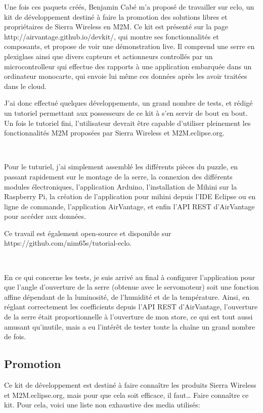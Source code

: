 \documentclass{article}
\begin{document}
Une fois ces paquets créés, Benjamin Cabé m’a proposé de travailler sur eclo, un kit de développement destiné à faire la promotion des solutions libres et propriétaires de Sierra Wireless en M2M. Ce kit est présenté sur la page http://airvantage.github.io/devkit/, qui montre ses fonctionnalités et composants, et propose de voir une démonstration live.
Il comprend une serre en plexiglass ainsi que divers capteurs et actionneurs controllés par un microcontrolleur qui effectue des rapports à une application embarquée dans un ordinateur monocarte, qui envoie lui même ces données après les avoir traitées dans le cloud.

J’ai donc effectué quelques développements, un grand nombre de tests, et rédigé un tutoriel permettant aux possesseurs de ce kit à s’en servir de bout en bout. Un fois le tutoriel fini, l’utilisateur devrait être capable d’utiliser pleinement les fonctionnalités M2M proposées par Sierra Wireless et M2M.eclipse.org.

~

Pour le tuturiel, j’ai simplement assemblé les différents pièces du puzzle, en passant rapidement sur le montage de la serre, la connexion des différents modules électroniques, l’application Arduino, l’installation de Mihini sur la Raspberry Pi, la création de l’application pour mihini depuis l’IDE Eclipse ou en ligne de commande, l’application AirVantage, et enfin l’API REST d’AirVantage pour accéder aux données.

Ce travail est également open-source et disponible sur https://github.com/nim65s/tutorial-eclo.

~

En ce qui concerne les tests, je suis arrivé au final à configurer l’application pour que l’angle d’ouverture de la serre (obtenue avec le servomoteur) soit une fonction affine dépendant de la luminosité, de l’humidité et de la température. 
Ainsi, en réglant correctement les coefficients depuis l’API REST d’AirVantage, l’ouverture de la serre était proportionnelle à l’ouverture de mon store, ce qui est tout aussi amusant qu’inutile, mais a eu l’intérêt de tester toute la chaîne un grand nombre de fois.

\subsection{Promotion}

Ce kit de développement est destiné à faire connaître les produits Sierra Wireless et M2M.eclipse.org, mais pour que cela soit efficace, il faut… Faire connaître ce kit. Pour cela, voici une liste non exhaustive des media utilisés:
\end{document}
